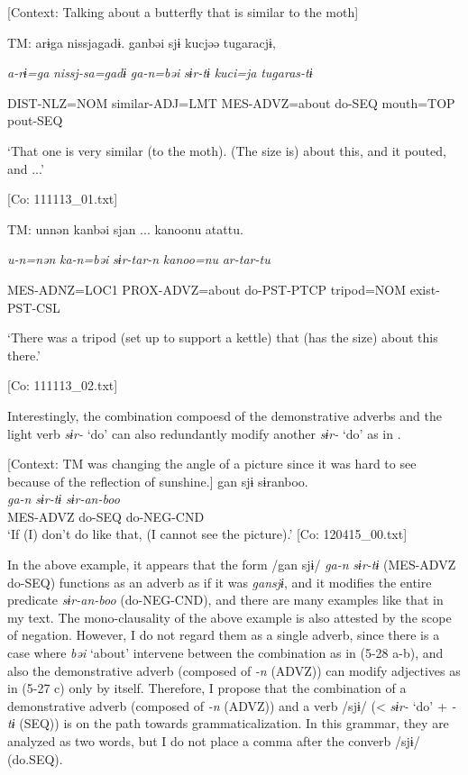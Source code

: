 \ea \label{ex:5:28}  \ea \label{ex:5:28a} [Context: Talking about a butterfly that is similar to the moth]

    TM:  arɨga  nissjagadɨ.  ganbəi  sjɨ  kucjəə  tugaracjɨ,

      \textit{a-rɨ=ga}  \textit{nissj-sa=gadɨ}  \textit{ga-n=bəi}  \textit{sɨr-tɨ}  \textit{kuci=ja}  \textit{tugaras-tɨ}
                                                                                   
      DIST-NLZ=NOM  similar-ADJ=LMT  MES-ADVZ=about  do-SEQ     mouth=TOP  pout-SEQ

      ‘That one is very similar (to the moth). (The size is) about this, and it pouted, and ...’

      [Co: 111113\_01.txt]

 \ex \label{ex:5:b} TM:  unnən  kanbəi  sjan  ...   kanoonu  atattu.    
                                                               
      \textit{u-n=nən}  \textit{ka-n=bəi}  \textit{sɨr-tar-n} \textit{kanoo=nu}  \textit{ar-tar-tu}     
                                                              
      MES-ADNZ=LOC1  PROX-ADVZ=about  do-PST-PTCP   tripod=NOM  exist-PST-CSL    

      ‘There was a tripod (set up to support a kettle) that (has the size) about this there.’

      [Co: 111113\_02.txt]
\z
\z

Interestingly, the combination compoesd of the demonstrative adverbs and the light verb \textit{sɨr-} ‘do’ can also redundantly modify another \textit{sɨr-} ‘do’ as in .

\ea \label{ex:5:29}   [Context: TM was changing the angle of a picture since it was hard to see because of the reflection of sunshine.]
\glll  gan  sjɨ  sɨranboo.\\
\textit{ga-n}  \textit{sɨr-tɨ}  \textit{sɨr-an-boo}\\
MES-ADVZ  do-SEQ  do-NEG-CND\\
\glt ‘If (I) don’t do like that, (I cannot see the picture).’ [Co: 120415\_00.txt]
\z

In the above example, it appears that the form /gan sjɨ/ \textit{ga-n} \textit{sɨr-tɨ} (MES-ADVZ do-SEQ) functions as an adverb as if it was \textit{gansjɨ}, and it modifies the entire predicate \textit{sɨr-an-boo} (do-NEG-CND), and there are many examples like that in my text. The mono-clausality of the above example is also attested by the scope of negation. However, I do not regard them as a single adverb, since there is a case where \textit{bəi} ‘about’ intervene between the combination as in (5-28 a-b), and also the demonstrative adverb (composed of \textit{{}-n} (ADVZ)) can modify adjectives as in (5-27 c) only by itself. Therefore, I propose that the combination of a demonstrative adverb (composed of \textit{{}-n} (ADVZ)) and a verb /sjɨ/ (< \textit{sɨr-} ‘do’ + \textit{{}-tɨ} (SEQ)) is on the path towards grammaticalization. In this grammar, they are analyzed as two words, but I do not place a comma after the converb /sjɨ/ (do.SEQ).


